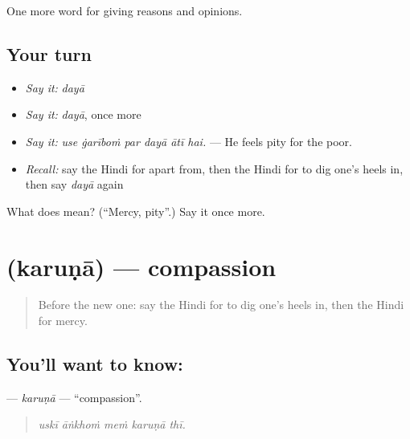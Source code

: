\begin{grammarlens}[title={What you've built}]
One more word for giving reasons and opinions.
\end{grammarlens}

\subsection*{Your turn}
\begin{itemize}
\raggedright
  \item \emph{Say it:} \emph{dayā}
  \item \emph{Say it:} \emph{dayā}, once more
  \item \emph{Say it:} \emph{use ġarīboṁ par dayā ātī hai.} — He feels pity for the poor.
  \item \emph{Recall:} say the Hindi for apart from, then the Hindi for to dig one's heels in, then say \emph{dayā} again
\end{itemize}

\begin{tcolorbox}[breakable,colback=teal!4,colframe=teal!35!black,title={Before you move on}]
What does  mean? (\textquotedblleft{}Mercy, pity\textquotedblright{}.) Say it once more.
\end{tcolorbox}
\section[\texorpdfstring{\hi{करुणा} (karuṇā)}{करुणा (karuṇā)}]{ (karuṇā) — compassion}

\label{lesson:HI-C372-karuna}



\begin{quote}
Before the new one: say the Hindi for to dig one's heels in, then the Hindi for mercy.
\end{quote}

\subsection*{You'll want to know: }
\textbf{} — \emph{karuṇā} — \textquotedblleft{}compassion\textquotedblright{}.

\begin{quote}
    
\end{quote}

\begin{quote}
\emph{uskī āṅkhoṁ meṁ karuṇā thī.}
\end{quote}

